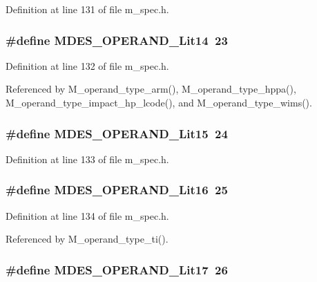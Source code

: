 Definition at line 131 of file m\_\-spec.h.
\subsubsection{\setlength{\rightskip}{0pt plus 5cm}\#define MDES\_\-OPERAND\_\-Lit14~23}\label{m__spec_8h_6cac5394390ff7c498d672a15338c10e}




Definition at line 132 of file m\_\-spec.h.

Referenced by M\_\-operand\_\-type\_\-arm(), M\_\-operand\_\-type\_\-hppa(), M\_\-operand\_\-type\_\-impact\_\-hp\_\-lcode(), and M\_\-operand\_\-type\_\-wims().
\subsubsection{\setlength{\rightskip}{0pt plus 5cm}\#define MDES\_\-OPERAND\_\-Lit15~24}\label{m__spec_8h_7ca3001b8e3d2b27c7a2bf5acadb1ff3}




Definition at line 133 of file m\_\-spec.h.
\subsubsection{\setlength{\rightskip}{0pt plus 5cm}\#define MDES\_\-OPERAND\_\-Lit16~25}\label{m__spec_8h_e27ef8807b94965d9e06d7b8f263fb6f}




Definition at line 134 of file m\_\-spec.h.

Referenced by M\_\-operand\_\-type\_\-ti().
\subsubsection{\setlength{\rightskip}{0pt plus 5cm}\#define MDES\_\-OPERAND\_\-Lit17~26}\label{m__spec_8h_8365ee3968c09727e7c9fee6023017f9}




